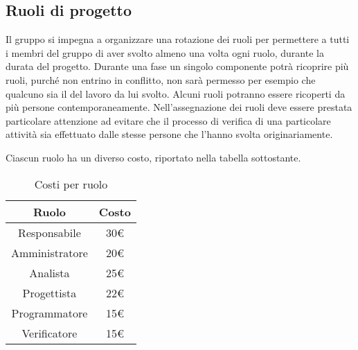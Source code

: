 \subsection{Ruoli di progetto}


Il gruppo \GroupName{} si impegna a organizzare una rotazione dei ruoli per permettere a tutti i membri del gruppo di aver svolto almeno una volta ogni ruolo, durante la durata del progetto. Durante una fase un singolo componente potrà ricoprire più ruoli, purché non entrino in conflitto, non sarà permesso per esempio che qualcuno sia il \Verificatore{} del lavoro da lui svolto. Alcuni ruoli potranno essere ricoperti da più persone contemporaneamente.
Nell'assegnazione dei ruoli deve essere prestata particolare attenzione ad evitare che il processo di verifica di una particolare attività sia effettuato dalle stesse persone che l'hanno svolta originariamente.

Ciascun ruolo ha un diverso costo, riportato nella tabella sottostante.
\begin{table}[H]
	\centering
	\begin{tabular}{|c|c|}
		\hline
		\textbf{Ruolo} &
		\textbf{Costo}\\
		\hline
		Responsabile & 30€  \\
		\hline
		Amministratore &  20€ \\
		\hline
		Analista & 25€  \\
		\hline
		Progettista & 22€  \\
		\hline 
		Programmatore & 15€  \\
		\hline
		Verificatore &  15€ \\
		\hline
	\end{tabular}
	\caption{Costi per ruolo}
\end{table}


